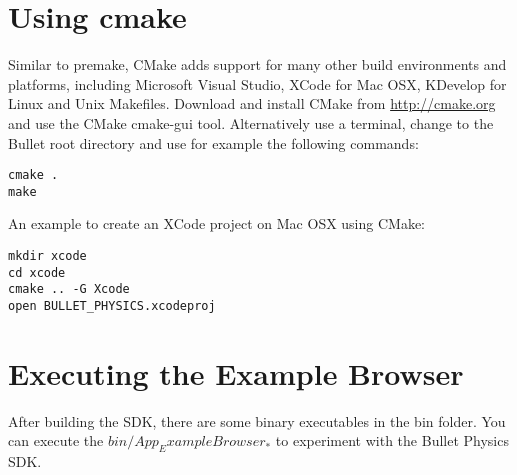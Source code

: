 \section{Using cmake}
Similar to premake, CMake adds support for many other build environments and platforms, including Microsoft Visual Studio, XCode for Mac OSX, KDevelop for Linux and Unix Makefiles. Download and install CMake from \url{http://cmake.org} and use the CMake cmake-gui tool. Alternatively use a terminal, change to the Bullet root directory and use for example the following commands:

\begin{lstlisting}[caption=CMake to GNU Makefile, label=cmake_make]
cmake . 
make
\end{lstlisting}
An example to create an XCode project on Mac OSX using CMake:
\begin{lstlisting}[caption=CMake to Xcode, label=cmake_xcode]
mkdir xcode
cd xcode
cmake .. -G Xcode
open BULLET_PHYSICS.xcodeproj
\end{lstlisting}


\section{Executing the Example Browser}
After building the SDK, there are some binary executables in the bin folder. You can execute the $bin/App_ExampleBrowser_*$ to experiment with the Bullet Physics SDK.
